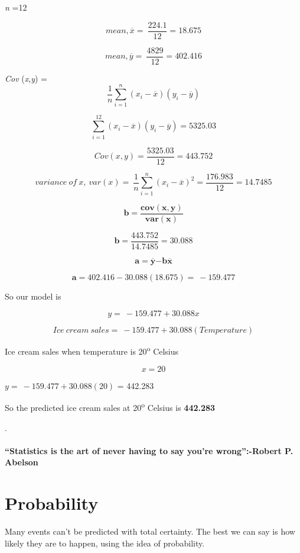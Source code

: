 \documentclass[
]{book}
\begin{document}
\emph{n} =12

\[mean,\overline{x} = \ \frac{224.1}{12} = 18.675\]

\[mean,\overline{y} = \ \frac{4829}{12} = 402.416\]

\emph{Cov} (\emph{x},\emph{y}) =
\[\frac{1}{n}\sum_{i = 1}^{n}{\left( x_{i} - \overline{x} \right)\left( y_{i} - \overline{y} \right)}\]

\[\sum_{i = 1}^{12}{\left( x_{i} - \overline{x} \right)\left( y_{i} - \overline{y} \right)} = 5325.03\]

\[Cov (x,y) = \frac{5325.03}{12} = 443.752\]

\[variance\ of\ x,\ var\left( x \right) = \ \frac{1}{n}\sum_{i = 1}^{n}\left( x_{i} - \overline{x} \right)^{2} = \frac{176.983}{12} = 14.7485\]

\[\mathbf{b =}\frac{\mathbf{cov(x,y)}}{\mathbf{var(x)}}\]

\[\mathbf{b =}\frac{443.752}{14.7485}\mathbf{=}30.088\]

\[\mathbf{a =}\overline{\mathbf{y}}\mathbf{- b}\overline{\mathbf{x}}\]

\[\mathbf{a =}402.416 - 30.088\left( 18.675 \right) = \  - 159.477\]

So our model is

\[y = \  - 159.477 + 30.088x\]

\[Ice\ cream\ sales = \  - 159.477 + 30.088(Temperature)\]

Ice cream sales when temperature is 20\textsuperscript{o} Celsius

\[x = 20\]

\(y = \  - 159.477 + 30.088(20)\) = 442.283

So the predicted ice cream sales at 20\textsuperscript{o} Celsius is \textbf{442.283}

.
~\\
\hspace*{0.333em}\\

\hypertarget{hello}{}
\textbf{``Statistics is the art of never having to say you're wrong'':-Robert P. Abelson}

\hypertarget{probability}{%
\chapter{Probability}\label{probability}}

Many events can't be predicted with total certainty. The best we can say is how likely they are to happen, using the idea of probability.
\end{document}
